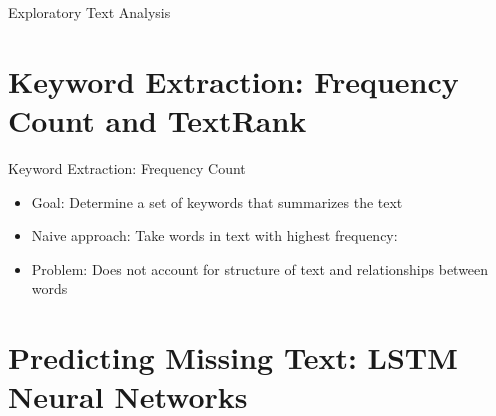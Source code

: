\documentclass{beamer}
\begin{document}
\begin{frame}{Exploratory Text Analysis}
\begin{figure}
\begin{minipage}{.5\textwidth}
	\end{minipage}
\end{figure}
\end{frame}
\section{Keyword Extraction: Frequency Count and TextRank}

\begin{frame}{Keyword Extraction: Frequency Count}
\begin{itemize}
	\item Goal: Determine a set of keywords that summarizes the text
	\item Naive approach: Take words in text with highest frequency:
	\item Problem: Does not account for structure of text and relationships between words
\end{itemize}
\end{frame}

\section{Predicting Missing Text: LSTM Neural Networks}





\end{document}
